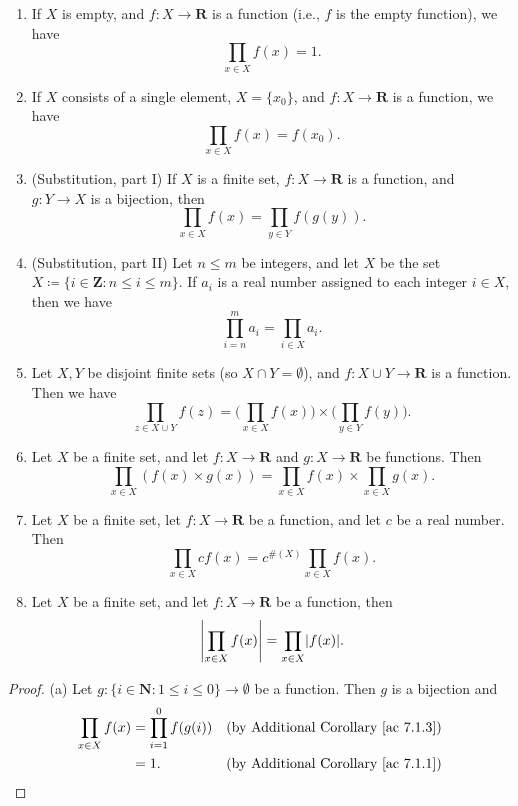 \begin{additional corollary}\label{ac 7.1.5}
\mbox{}
\begin{enumerate}
    \item If \(X\) is empty, and \(f : X \to \mathbf{R}\) is a function (i.e., \(f\) is the empty function), we have
          \[
              \prod_{x \in X} f(x) = 1.
          \]
    \item If \(X\) consists of a single element, \(X = \{x_0\}\), and \(f : X \to \mathbf{R}\) is a function, we have
          \[
              \prod_{x \in X} f(x) = f(x_0).
          \]
    \item (Substitution, part I) If \(X\) is a finite set, \(f : X \to \mathbf{R}\) is a function, and \(g : Y \to X\) is a bijection, then
          \[
              \prod_{x \in X} f(x) = \prod_{y \in Y} f(g(y)).
          \]
    \item (Substitution, part II) Let \(n \leq m\) be integers, and let \(X\) be the set \(X \coloneqq \{i \in \mathbf{Z} : n \leq i \leq m\}\).
          If \(a_i\) is a real number assigned to each integer \(i \in X\), then we have
          \[
              \prod_{i = n}^m a_i = \prod_{i \in X} a_i.
          \]
    \item Let \(X, Y\) be disjoint finite sets (so \(X \cap Y = \emptyset\)), and \(f : X \cup Y \to \mathbf{R}\) is a function.
          Then we have
          \[
              \prod_{z \in X \cup Y} f(z) = \Bigg(\prod_{x \in X} f(x)\Bigg) \times \Bigg(\prod_{y \in Y} f(y)\Bigg).
          \]
    \item Let \(X\) be a finite set, and let \(f : X \to \mathbf{R}\) and \(g : X \to \mathbf{R}\) be functions.
          Then
          \[
              \prod_{x \in X} (f(x) \times g(x)) = \prod_{x \in X} f(x) \times \prod_{x \in X} g(x).
          \]
    \item Let \(X\) be a finite set, let \(f : X \to \mathbf{R}\) be a function, and let \(c\) be a real number.
          Then
          \[
              \prod_{x \in X} cf(x) = c^{\#(X)} \prod_{x \in X} f(x).
          \]
    \item Let \(X\) be a finite set, and let \(f : X \to \mathbf{R}\) be a function, then
          \[
              \abs*{\prod_{x \in X} f(x)} = \prod_{x \in X} \abs*{f(x)}.
          \]
\end{enumerate}
\end{additional corollary}

\begin{proof}{(a)}
    Let \(g : \{i \in \mathbf{N} : 1 \leq i \leq 0\} \to \emptyset\) be a function.
    Then \(g\) is a bijection and
    \begin{align*}
        \prod_{x \in X} f(x) & = \prod_{i = 1}^0 f(g(i)) & \text{(by Additional Corollary \ref{ac 7.1.3})} \\
                             & = 1.                      & \text{(by Additional Corollary \ref{ac 7.1.1})}
    \end{align*}
\end{proof}

